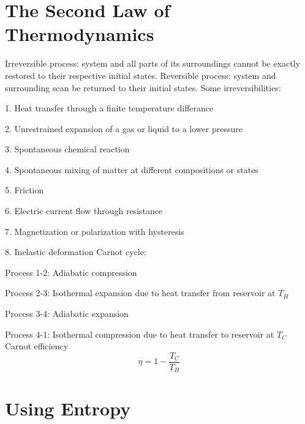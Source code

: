 \documentclass[paper=letter, fontsize=11pt]{scrartcl}
\numberwithin{equation}{section}        %
\numberwithin{figure}{section}          %
\numberwithin{table}{section}               %
\begin{document}
\newpage
\section{The Second Law of Thermodynamics}

Irreversible process: system and all parts of its surroundings cannot be exactly restored to their respective initial states.
\newline
\newline
Reversible process: system and surrounding scan be returned to their initial states.
\newline
\newline
Some irreversibilities:

1. Heat transfer through a finite temperature differance

2. Unrestrained expansion of a gas or liquid to a lower pressure

3. Spontaneous chemical reaction

4. Spontaneous mixing of matter at different compositions or states

5. Friction

6. Electric current flow through resistance

7. Magnetization or polarization with hysteresis

8. Inelastic deformation
\newline
\newline
Carnot cycle:

Process 1-2: Adiabatic compression

Process 2-3: Isothermal expansion due to heat transfer from reservoir at $T_H$

Process 3-4: Adiabatic expansion

Process 4-1: Isothermal compression due to heat transfer to reservoir at $T_C$
\newline
\newline
Carnot efficiency
\begin{equation}
    \eta = 1 - \frac{T_C}{T_H}
\end{equation}


\newpage
\section{Using Entropy}
\end{document}
